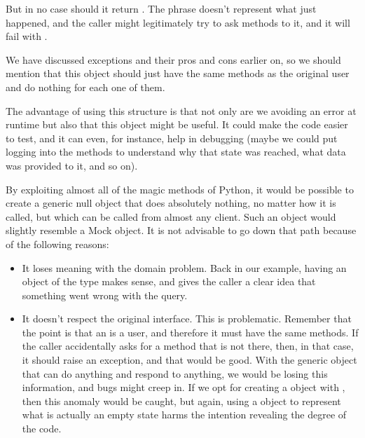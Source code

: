 \documentclass[a4paper,10pt,english]{sphinxmanual}
\begin{document}
But in no case should it return . The phrase  doesn’t represent what just
happened, and the caller might legitimately try to ask methods to it, and it will fail with
.

We have discussed exceptions and their pros and cons earlier on, so we should mention
that this  object should just have the same methods as the original user and do nothing
for each one of them.

The advantage of using this structure is that not only are we avoiding an error at runtime
but also that this object might be useful. It could make the code easier to test, and it can
even, for instance, help in debugging (maybe we could put logging into the methods to
understand why that state was reached, what data was provided to it, and so on).

By exploiting almost all of the magic methods of Python, it would be possible to create a
generic null object that does absolutely nothing, no matter how it is called, but which can
be called from almost any client. Such an object would slightly resemble a Mock object. It is
not advisable to go down that path because of the following reasons:
\begin{itemize}
\item {} 
It loses meaning with the domain problem. Back in our example, having an object of the  type makes sense, and gives the caller a clear idea that something went wrong with the query.

\item {} 
It doesn’t respect the original interface. This is problematic. Remember that the point is that an  is a user, and therefore it must have the same methods. If the caller accidentally asks for a method that is not there, then, in that case, it should raise an  exception, and that would be good. With the generic  object that can do anything and respond to anything, we would be losing this information, and bugs might creep in. If we opt for creating a  object with , then this anomaly would be caught, but again, using a  object to represent what is actually an empty state harms the intention revealing the degree of the code.

\end{itemize}
\end{document}
